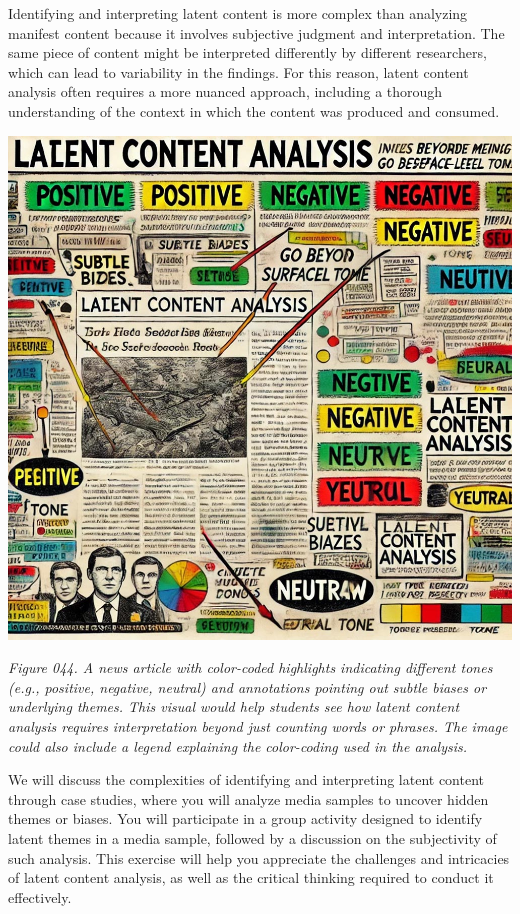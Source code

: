 \documentclass[
]{book}
\begin{document}
Identifying and interpreting latent content is more complex than analyzing manifest content because it involves subjective judgment and interpretation. The same piece of content might be interpreted differently by different researchers, which can lead to variability in the findings. For this reason, latent content analysis often requires a more nuanced approach, including a thorough understanding of the context in which the content was produced and consumed.

\includegraphics[width=1\linewidth,height=\textheight,keepaspectratio]{images/fig044.jpg}

\emph{Figure 044. A news article with color-coded highlights indicating different tones (e.g., positive, negative, neutral) and annotations pointing out subtle biases or underlying themes. This visual would help students see how latent content analysis requires interpretation beyond just counting words or phrases. The image could also include a legend explaining the color-coding used in the analysis.}

We will discuss the complexities of identifying and interpreting latent content through case studies, where you will analyze media samples to uncover hidden themes or biases. You will participate in a group activity designed to identify latent themes in a media sample, followed by a discussion on the subjectivity of such analysis. This exercise will help you appreciate the challenges and intricacies of latent content analysis, as well as the critical thinking required to conduct it effectively.
\end{document}
